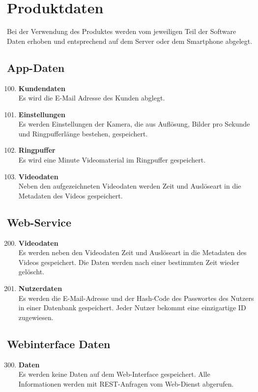 \chapter{Produktdaten}
Bei der Verwendung des Produktes werden vom jeweiligen Teil der Software Daten erhoben und entsprechend auf dem Server oder dem \gls{Smartphone} abgelegt.
\section{App-Daten}
\begin{enumerate}[\bfseries{PD}10]
	\setcounter{enumi}{99}
\item \textbf{Kundendaten} \hfill \\
Es wird die E-Mail Adresse des Kunden abglegt.
\item \textbf{Einstellungen} \hfill \\
Es werden Einstellungen der Kamera, die aus Auflösung, Bilder pro Sekunde und \gls{Ringpuffer}länge bestehen, gespeichert.
\item \textbf{\gls{Ringpuffer}} \hfill \\
Es wird eine Minute Videomaterial im \gls{Ringpuffer} gespeichert.
\item \textbf{Videodaten} \hfill \\
Neben den aufgezeichneten Videodaten werden Zeit und Auslöseart in die \gls{Metadaten} des Videos gespeichert.
\end{enumerate}

\section{Web-Service}
\begin{enumerate}[\bfseries{PK}10]
	\setcounter{enumi}{199}
\item \textbf{Videodaten} \hfill \\
Es werden neben den Videodaten Zeit und Auslöseart in die \gls{Metadaten} des Videos gespeichert. Die Daten werden nach einer bestimmten Zeit wieder gelöscht.
\item \textbf{Nutzerdaten} \hfill \\
Es werden die \gls{E-Mail}-Adresse und der \gls{Hash-Code} des Passwortes des Nutzers in einer Datenbank gespeichert. Jeder Nutzer bekommt eine einzigartige ID zugewiesen. 
\end{enumerate}

\section{Webinterface Daten}
\begin{enumerate}[\bfseries{PK}10]
	\setcounter{enumi}{299}
\item \textbf{Daten} \hfill \\
Es werden keine Daten auf dem \gls{Web-Interface} gespeichert. Alle Informationen werden mit REST-Anfragen vom \gls{Web-Dienst} abgerufen.
\end{enumerate}


